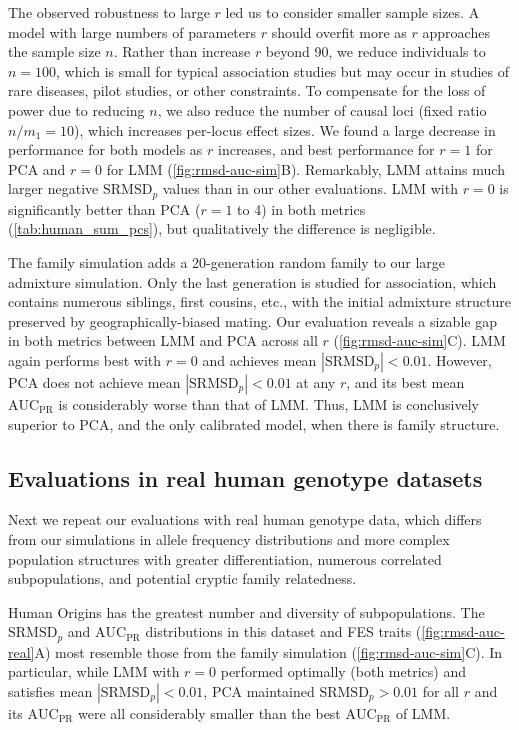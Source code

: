 \documentclass[11pt]{article}
\newcommand{\rmsd}{\text{SRMSD}_p}
\newcommand{\auc}{\text{AUC}_\text{PR}}
\begin{document}
The observed robustness to large $r$ led us to consider smaller sample sizes.
A model with large numbers of parameters $r$ should overfit more as $r$ approaches the sample size $n$.
Rather than increase $r$ beyond 90, we reduce individuals to $n = 100$, which is small for typical association studies but may occur in studies of rare diseases, pilot studies, or other constraints.
To compensate for the loss of power due to reducing $n$, we also reduce the number of causal loci (fixed ratio $n / m_1 = 10$), which increases per-locus effect sizes.
We found a large decrease in performance for both models as $r$ increases, and best performance for $r=1$ for PCA and $r=0$ for LMM (\cref{fig:rmsd-auc-sim}B).
Remarkably, LMM attains much larger negative $\rmsd$ values than in our other evaluations.
LMM with $r=0$ is significantly better than PCA ($r=1$ to 4) in both metrics (\cref{tab:human_sum_pcs}), but qualitatively the difference is negligible.

The family simulation adds a 20-generation random family to our large admixture simulation.
Only the last generation is studied for association, which contains numerous siblings, first cousins, etc., with the initial admixture structure preserved by geographically-biased mating.
Our evaluation reveals a sizable gap in both metrics between LMM and PCA across all $r$ (\cref{fig:rmsd-auc-sim}C).
LMM again performs best with $r=0$ and achieves mean $|\rmsd| < 0.01$.
However, PCA does not achieve mean $|\rmsd| < 0.01$ at any $r$, and its best mean $\auc$ is considerably worse than that of LMM.
Thus, LMM is conclusively superior to PCA, and the only calibrated model, when there is family structure.

\subsection{Evaluations in real human genotype datasets}

Next we repeat our evaluations with real human genotype data, which differs from our simulations in allele frequency distributions and more complex population structures with greater differentiation, numerous correlated subpopulations, and potential cryptic family relatedness.

Human Origins has the greatest number and diversity of subpopulations.
The $\rmsd$ and $\auc$ distributions in this dataset and FES traits (\cref{fig:rmsd-auc-real}A) most resemble those from the family simulation (\cref{fig:rmsd-auc-sim}C).
In particular, while LMM with $r=0$ performed optimally (both metrics) and satisfies mean $|\rmsd| < 0.01$, PCA maintained $\rmsd > 0.01$ for all $r$ and its $\auc$ were all considerably smaller than the best $\auc$ of LMM.
\end{document}
